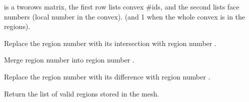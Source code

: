 \documentclass[a4paper,11pt,english]{sphinxmanual}
\begin{document}
\begin{fulllineitems}
\begin{fulllineitems}
 is a two\sphinxhyphen{}rows matrix, the first row lists convex \#ids,
and the second lists face numbers (local number in the convex).
(and \sphinxhyphen{}1 when the whole convex is in the
regions).

\end{fulllineitems}


\begin{fulllineitems}
\label{\detokenize{python/cmdref_Mesh:getfem.Mesh.region_intersect}}
Replace the region number  with its intersection with region number .

\end{fulllineitems}


\begin{fulllineitems}
\label{\detokenize{python/cmdref_Mesh:getfem.Mesh.region_merge}}
Merge region number  into region number .

\end{fulllineitems}


\begin{fulllineitems}
\label{\detokenize{python/cmdref_Mesh:getfem.Mesh.region_subtract}}
Replace the region number  with its difference with region
number .

\end{fulllineitems}


\begin{fulllineitems}
\label{\detokenize{python/cmdref_Mesh:getfem.Mesh.regions}}
Return the list of valid regions stored in the mesh.


\end{fulllineitems}
\end{fulllineitems}
\end{document}

